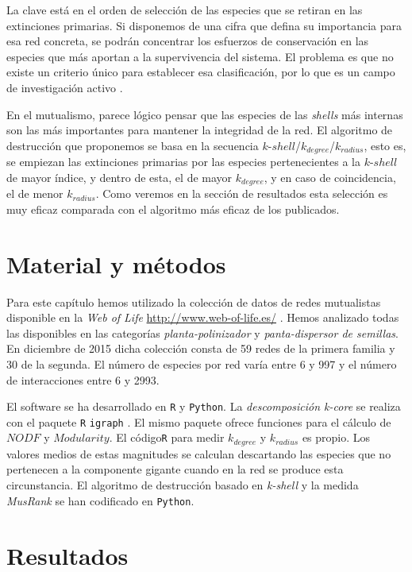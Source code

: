 La clave está en el orden de selección de las especies que se retiran en las extinciones primarias. Si disponemos de una cifra que defina su importancia para esa red concreta, se podrán concentrar los esfuerzos de conservación en las especies que más aportan a la supervivencia del sistema. El problema es que no existe un criterio único para establecer esa clasificación, por lo que es un campo de investigación activo \citep{dominguez2015ranking}.

En el mutualismo, parece lógico pensar que las especies de las \textit{shells} más internas son las más importantes para mantener la integridad de la red. El algoritmo de destrucción que proponemos se basa en la secuencia $k$-$shell$/$k_{degree}$/$k_{radius}$, esto es, se empiezan las extinciones primarias por las especies pertenecientes a la $k$-$shell$ de mayor índice, y dentro de esta, el de mayor $k_{degree}$, y en caso de coincidencia, el de menor $k_{radius}$. Como veremos en la sección de resultados esta selección es muy eficaz comparada con el algoritmo más eficaz de los publicados. 


\section{Material y métodos}

Para este capítulo hemos utilizado la colección de datos de redes mutualistas disponible en la \textit{Web of Life}  \url{http://www.web-of-life.es/} \cite{fortuna2014web}. Hemos analizado todas las disponibles en las categorías \textit{planta-polinizador} y \textit{panta-dispersor de semillas}. En diciembre de 2015 dicha colección consta de 59 redes de la primera familia y 30 de la segunda. El número de especies por red varía entre 6 y 997 y el número de interacciones entre 6 y 2993.

El software se ha desarrollado en \texttt{R} y \texttt{Python}. La \textit{descomposición k-core} se realiza con el paquete \texttt{R} \texttt{igraph} \cite{csardi2006igraph}. El mismo paquete ofrece funciones para el cálculo de $NODF$ y $Modularity$. El código\texttt{R} para medir ${k}_{degree}$ y ${k}_{radius}$ es propio. Los valores medios de estas magnitudes se calculan descartando las especies que no pertenecen a la componente gigante cuando en la red se produce esta circunstancia. El algoritmo de destrucción basado en \textit{k-shell} y la medida \textit{MusRank} se han codificado en \texttt{Python}.

\clearpage
\section{Resultados}

